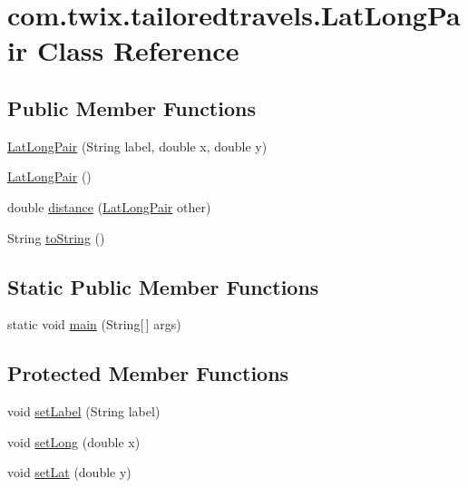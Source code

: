 \hypertarget{classcom_1_1twix_1_1tailoredtravels_1_1_lat_long_pair}{\section{com.\-twix.\-tailoredtravels.\-Lat\-Long\-Pair Class Reference}
\label{classcom_1_1twix_1_1tailoredtravels_1_1_lat_long_pair}
}
\subsection*{Public Member Functions}
\begin{DoxyCompactItemize}
\item 
\hyperlink{classcom_1_1twix_1_1tailoredtravels_1_1_lat_long_pair_a954bc334e0655d6aba61889148763c59}{Lat\-Long\-Pair} (String label, double x, double y)
\item 
\hyperlink{classcom_1_1twix_1_1tailoredtravels_1_1_lat_long_pair_a31d06b625d306f8c9fec890088e057e8}{Lat\-Long\-Pair} ()
\item 
double \hyperlink{classcom_1_1twix_1_1tailoredtravels_1_1_lat_long_pair_afe76298eaa3ba7818803b3cbabbbba7c}{distance} (\hyperlink{classcom_1_1twix_1_1tailoredtravels_1_1_lat_long_pair}{Lat\-Long\-Pair} other)
\item 
String \hyperlink{classcom_1_1twix_1_1tailoredtravels_1_1_lat_long_pair_a525ff91d655b14072016deec5b5d78aa}{to\-String} ()
\end{DoxyCompactItemize}
\subsection*{Static Public Member Functions}
\begin{DoxyCompactItemize}
\item 
static void \hyperlink{classcom_1_1twix_1_1tailoredtravels_1_1_lat_long_pair_afb325ba5da71762d52a02d9c0a2af44f}{main} (String\mbox{[}$\,$\mbox{]} args)
\end{DoxyCompactItemize}
\subsection*{Protected Member Functions}
\begin{DoxyCompactItemize}
\item 
void \hyperlink{classcom_1_1twix_1_1tailoredtravels_1_1_lat_long_pair_a52ca9e22f6dd4ef0e059b517eca384f3}{set\-Label} (String label)
\item 
void \hyperlink{classcom_1_1twix_1_1tailoredtravels_1_1_lat_long_pair_a0eec3e1362c2d480a6fa0dd0bb05f277}{set\-Long} (double x)
\item 
void \hyperlink{classcom_1_1twix_1_1tailoredtravels_1_1_lat_long_pair_a990f96e43c4606cbadab780cd52b57c4}{set\-Lat} (double y)
\end{DoxyCompactItemize}


